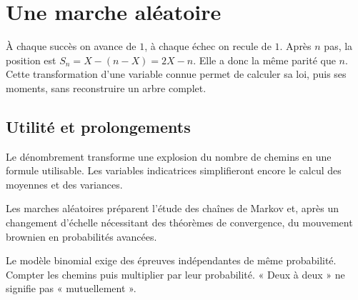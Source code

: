 \documentclass[../cours_1re.tex]{subfiles}
\begin{document}
\section{Une marche aléatoire}
À chaque succès on avance de $1$, à chaque échec on recule de $1$.
Après $n$ pas, la position est $S_n=X-(n-X)=2X-n$.
Elle a donc la même parité que $n$. Cette transformation d'une variable
connue permet de calculer sa loi, puis ses moments, sans reconstruire
un arbre complet.

\begin{finchapitre}
\section{Utilité et prolongements}
Le dénombrement transforme une explosion du nombre de chemins en une
formule utilisable. Les variables indicatrices simplifieront encore le calcul
des moyennes et des variances.

Les marches aléatoires préparent l'étude des chaînes de Markov et, après
un changement d'échelle nécessitant des théorèmes de convergence,
du mouvement brownien en probabilités avancées.
\begin{retenir}
Le modèle binomial exige des épreuves indépendantes de même probabilité.
Compter les chemins puis multiplier par leur probabilité. « Deux à deux » ne signifie pas « mutuellement ».
\end{retenir}
\end{finchapitre}
\end{document}
